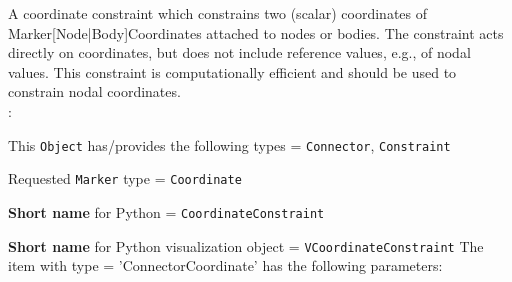 \ei

%
\newpage


\label{sec:item:ObjectConnectorCoordinate}
A coordinate constraint which constrains two (scalar) coordinates of Marker[Node|Body]Coordinates attached to nodes or bodies. The constraint acts directly on coordinates, but does not include reference values, e.g., of nodal values. This constraint is computationally efficient and should be used to constrain nodal coordinates.
\vspace{12pt}\\

\noindent {}:
\bi
  \item This \texttt{Object} has/provides the following types = \texttt{Connector}, \texttt{Constraint}
  \item Requested \texttt{Marker} type = \texttt{Coordinate}
  \item {\bf Short name} for Python = \texttt{CoordinateConstraint}
  \item {\bf Short name} for Python visualization object = \texttt{VCoordinateConstraint}
\ei\vspace{12pt} \noindent 
The item  with type = 'ConnectorCoordinate' has the following parameters:
\vspace{-0.5cm}\\
\vspace{-0.5cm}\\
